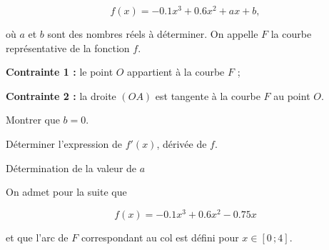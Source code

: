 \documentclass[answers]{exam}
\begin{document}
\[
  f(x)=-0.1x^{3}+0.6x^{2}+ax+b ,
\]

où $a$ et $b$ sont des nombres réels à déterminer.
On appelle $F$ la courbe représentative de la fonction $f$.

\begin{compactenum}
  \item \textbf{Contrainte 1 :} le point $O$ appartient à la courbe $F$ ;
  \item \textbf{Contrainte 2 :} la droite $(OA)$ est tangente à la courbe $F$ au point $O$.
\end{compactenum}


\begin{questions}

  \question[0.5] Montrer que $b = 0$.
  
  \question[1] Déterminer l’expression de $f'(x)$, dérivée de $f$.
  
  \question[2.5] Détermination de la valeur de $a$
  \question[5.5] On admet pour la suite que
  
  \[
  f(x) = -0.1x^{3} + 0.6x^{2} - 0.75x
  \]
  
  et que l’arc de $F$ correspondant au col est défini pour $x \in [0\,;4]$.
  
\end{questions}
\end{document}
